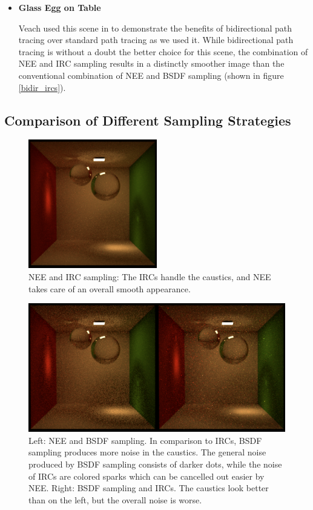 \begin{itemize}
\item \textbf{Glass Egg on Table}

Veach used this scene in \cite[chapter 10]{veachdiss} to demonstrate the benefits of bidirectional path tracing over standard path tracing as we used it. While bidirectional path tracing is without a doubt the better choice for this scene, the combination of NEE and IRC sampling results in a distinctly smoother image than the conventional combination of NEE and BSDF sampling (shown in figure \ref{bidir_ircs}).
\end{itemize}

\newpage
\subsection{Comparison of Different Sampling Strategies}



 \begin{figure}[h!]
 \centering
 \includegraphics[width=0.5\textwidth]{bilder/kugelbox/nee&caches_200k20k2k_256spp.png}
\caption{NEE and IRC sampling: The IRCs handle the caustics, and NEE takes care of an overall smooth appearance.}
 \label{kugel_nee_caches}\end{figure}


 \begin{figure}[h!]
 \centering
 \includegraphics[width=1\textwidth]{bilder/kugelbox/bsdfcombos.png}
\caption{Left: NEE and BSDF sampling. In comparison to IRCs, BSDF sampling produces more noise in the caustics. The general noise produced by BSDF sampling consists of darker dots, while the noise of IRCs are colored sparks which can be cancelled out easier by NEE.\newline
Right: BSDF sampling and IRCs. The caustics look better than on the left, but the overall noise is worse.}
  \label{kugel_BSDF}\end{figure}

